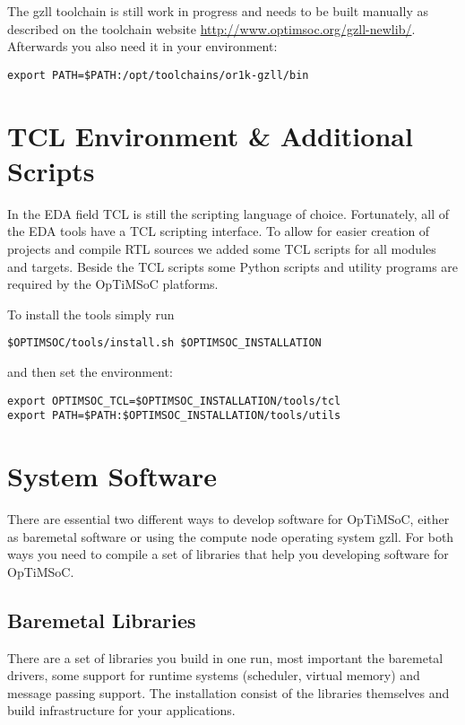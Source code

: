 The gzll toolchain is still work in progress and needs to be built
manually as described on the toolchain website
\url{http://www.optimsoc.org/gzll-newlib/}. Afterwards you also need
it in your environment:

\begin{lstlisting}
export PATH=$PATH:/opt/toolchains/or1k-gzll/bin
\end{lstlisting}

\section{TCL Environment \& Additional Scripts}

In the EDA field TCL is still the scripting language of choice.
Fortunately, all of the EDA tools have a TCL scripting interface. To
allow for easier creation of projects and compile RTL sources we added
some TCL scripts for all modules and targets. Beside the TCL scripts
some Python scripts and utility programs are required by the OpTiMSoC
platforms.

To install the tools simply run

\begin{lstlisting}
$OPTIMSOC/tools/install.sh $OPTIMSOC_INSTALLATION
\end{lstlisting}

and then set the environment:

\begin{lstlisting}
export OPTIMSOC_TCL=$OPTIMSOC_INSTALLATION/tools/tcl
export PATH=$PATH:$OPTIMSOC_INSTALLATION/tools/utils
\end{lstlisting}

\section{System Software}

There are essential two different ways to develop software for
OpTiMSoC, either as baremetal software or using the compute node
operating system gzll. For both ways you need to compile a set of
libraries that help you developing software for OpTiMSoC.

\subsection{Baremetal Libraries}

There are a set of libraries you build in one run, most important the
baremetal drivers, some support for runtime systems (scheduler,
virtual memory) and message passing support. The installation consist
of the libraries themselves and build infrastructure for your
applications.

